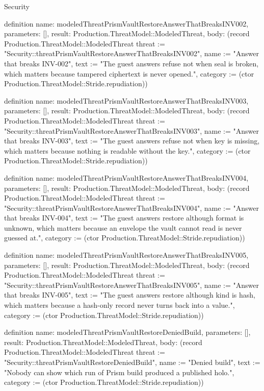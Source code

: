 \begin{lexlean}{Security}
\begin{semanticmodule}
definition{
  name: modeledThreatPrismVaultRestoreAnswerThatBreaksINV002,
  parameters: [],
  result: Production.ThreatModel::ModeledThreat,
  body: (record Production.ThreatModel::ModeledThreat {threat := "Security::threatPrismVaultRestoreAnswerThatBreaksINV002", name := "Answer that breaks INV-002", text := "The guest answers refuse not when seal is broken, which matters because tampered ciphertext is never opened.", category := (ctor Production.ThreatModel::Stride.repudiation)})
}

definition{
  name: modeledThreatPrismVaultRestoreAnswerThatBreaksINV003,
  parameters: [],
  result: Production.ThreatModel::ModeledThreat,
  body: (record Production.ThreatModel::ModeledThreat {threat := "Security::threatPrismVaultRestoreAnswerThatBreaksINV003", name := "Answer that breaks INV-003", text := "The guest answers refuse not when key is missing, which matters because nothing is readable without the key.", category := (ctor Production.ThreatModel::Stride.repudiation)})
}

definition{
  name: modeledThreatPrismVaultRestoreAnswerThatBreaksINV004,
  parameters: [],
  result: Production.ThreatModel::ModeledThreat,
  body: (record Production.ThreatModel::ModeledThreat {threat := "Security::threatPrismVaultRestoreAnswerThatBreaksINV004", name := "Answer that breaks INV-004", text := "The guest answers restore although format is unknown, which matters because an envelope the vault cannot read is never guessed at.", category := (ctor Production.ThreatModel::Stride.repudiation)})
}

definition{
  name: modeledThreatPrismVaultRestoreAnswerThatBreaksINV005,
  parameters: [],
  result: Production.ThreatModel::ModeledThreat,
  body: (record Production.ThreatModel::ModeledThreat {threat := "Security::threatPrismVaultRestoreAnswerThatBreaksINV005", name := "Answer that breaks INV-005", text := "The guest answers restore although kind is hash, which matters because a hash-only record never turns back into a value.", category := (ctor Production.ThreatModel::Stride.repudiation)})
}

definition{
  name: modeledThreatPrismVaultRestoreDeniedBuild,
  parameters: [],
  result: Production.ThreatModel::ModeledThreat,
  body: (record Production.ThreatModel::ModeledThreat {threat := "Security::threatPrismVaultRestoreDeniedBuild", name := "Denied build", text := "Nobody can show which run of Prism build produced a published holo.", category := (ctor Production.ThreatModel::Stride.repudiation)})
}


\end{semanticmodule}
\end{lexlean}
